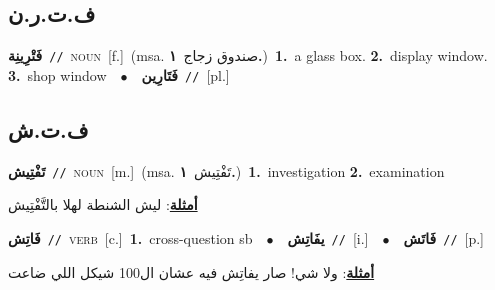 \documentclass[10pt,a4paper,twoside]{article} %
\begin{document}
\begin{multicols}{2}
{{{{\vspace{-3mm}
\subsection*{\color{blue}\foreignlanguage{arabic}{ف.ت.ر.ن}\color{blue}{ (ntws)}} 

{\setlength\topsep{0pt}\textbf{\foreignlanguage{arabic}{فَتْرِينِة}}\ {\color{gray}\texttt{//}\color{black}}\ \textsc{noun}\ [f.]\ \color{gray}(msa. \foreignlanguage{arabic}{صندوق زجاج}~\foreignlanguage{arabic}{\textbf{١.}})\color{black}\ \textbf{1.}~a glass box.  \textbf{2.}~display window.  \textbf{3.}~shop window\ \ $\bullet$\ \ \setlength\topsep{0pt}\textbf{\foreignlanguage{arabic}{فَتَارِين}}\ {\color{gray}\texttt{//}\color{black}}\ [pl.]\ 

\vspace{-3mm}
\subsection*{\color{blue}\foreignlanguage{arabic}{ف.ت.ش}\color{blue}{}} 

{\setlength\topsep{0pt}\textbf{\foreignlanguage{arabic}{تَفْتِيش}}\ {\color{gray}\texttt{//}\color{black}}\ \textsc{noun}\ [m.]\ \color{gray}(msa. \foreignlanguage{arabic}{تَفْتِيش}~\foreignlanguage{arabic}{\textbf{١.}})\color{black}\ \textbf{1.}~investigation  \textbf{2.}~examination\  \begin{flushright}\color{gray}\foreignlanguage{arabic}{\textbf{\underline{\foreignlanguage{arabic}{أمثلة}}}: ليش الشنطة لهلا بالتَّفْتِيش}\end{flushright}\color{black}} \vspace{2mm}

{\setlength\topsep{0pt}\textbf{\foreignlanguage{arabic}{فَاتِش}}\ {\color{gray}\texttt{//}\color{black}}\ \textsc{verb}\ [c.]\ \textbf{1.}~cross-question sb\ \ $\bullet$\ \ \setlength\topsep{0pt}\textbf{\foreignlanguage{arabic}{يفَاتِش}}\ {\color{gray}\texttt{//}\color{black}}\ [i.]\ \ $\bullet$\ \ \setlength\topsep{0pt}\textbf{\foreignlanguage{arabic}{فَاتَش}}\ {\color{gray}\texttt{//}\color{black}}\ [p.]\  \begin{flushright}\color{gray}\foreignlanguage{arabic}{\textbf{\underline{\foreignlanguage{arabic}{أمثلة}}}: ولا شي! صار يفاتِش فيه عشان ال100 شيكل اللي ضاعت}\end{flushright}\color{black}} \vspace{2mm}

}}}}}
\end{multicols}
\end{document}

